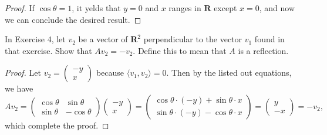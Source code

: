 {{\begin{solution}
\begin{proof}
            If $\cos \theta = 1$, it yelds that $y = 0$ and $x$ ranges in $\mathbf{R}$ except $x = 0$, and now we can conclude the desired result. 
        \end{proof}
    \end{solution}
    \item 
    In Exercise 4, let $v_2$ be a vector of $\mathbf{R}^2$ perpendicular to the vector $v_1$ found in that exercise. 
    Show that $Av_2 = -v_2$. 
    Define this to mean that $A$ is a reflection. 
    \begin{solution}
        \begin{proof}
            Let $v_2 = \begin{pmatrix} -y \\ x \end{pmatrix}$ because $\langle v_1, v_2 \rangle = 0$. 
            Then by the listed out equations, we have 
            \begin{equation*}
                Av_2 = 
                \begin{pmatrix}
                    \cos \theta & \sin \theta \\
                \sin \theta & -\cos \theta 
                \end{pmatrix}
                \begin{pmatrix} 
                    -y \\ x 
                \end{pmatrix} = 
                \begin{pmatrix} 
                    \cos \theta \cdot (-y) + \sin \theta \cdot x \\ 
                    \sin \theta \cdot (-y) - \cos \theta \cdot x
                \end{pmatrix} =
                \begin{pmatrix} 
                    y \\ -x 
                \end{pmatrix} = -v_2, 
            \end{equation*}
            which complete the proof. 
        \end{proof}
    \end{solution}
    \item 
    \item 
}
}